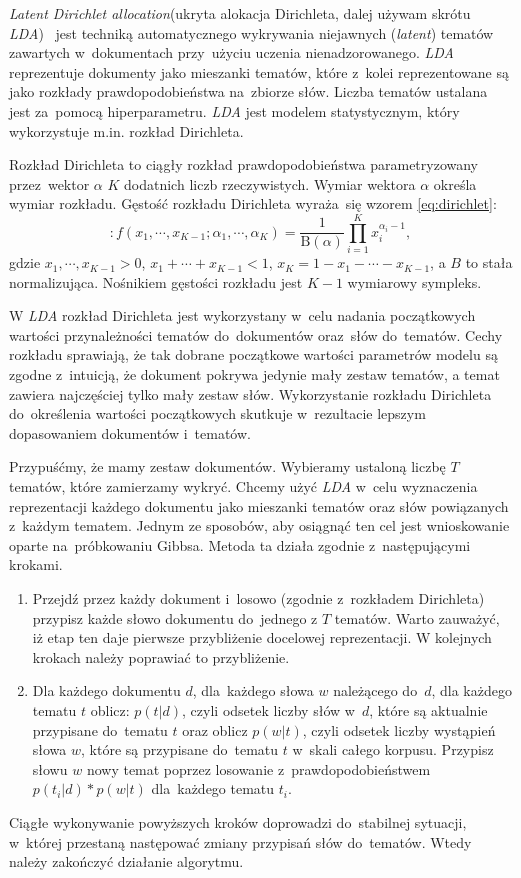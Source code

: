 \documentclass[pl]{minipw} %
\begin{document}
\textit{Latent Dirichlet allocation}(ukryta alokacja Dirichleta, dalej używam skrótu  \textit{LDA})~\cite{lda} jest techniką automatycznego wykrywania niejawnych (\textit{latent}) tematów zawartych w~dokumentach przy~użyciu uczenia nienadzorowanego. \textit{LDA} reprezentuje dokumenty jako mieszanki tematów, które z~kolei reprezentowane są jako rozkłady prawdopodobieństwa na~zbiorze słów. Liczba tematów ustalana jest za~pomocą hiperparametru. \textit{LDA} jest modelem statystycznym, który wykorzystuje m.in. rozkład Dirichleta. 

Rozkład Dirichleta to ciągły rozkład prawdopodobieństwa parametryzowany przez~wektor $\alpha$ $K$ dodatnich liczb rzeczywistych. Wymiar wektora $\alpha$ określa wymiar rozkładu. Gęstość rozkładu Dirichleta wyraża~się wzorem \ref{eq:dirichlet}: 
\begin{equation}
\label{eq:dirichlet}: 
f\left(x_{1},\cdots ,x_{K-1};\alpha _{1},\cdots ,\alpha _{K}\right)={\frac {1}{\mathrm {B} (\alpha )}}\prod _{i=1}^{K}x_{i}^{\alpha _{i}-1},
\end{equation}
gdzie $ x_{1},\cdots ,x_{K-1}>0$, $x_{1}+\cdots +x_{K-1}<1$, $x_{K}=1-x_{1}-\cdots -x_{K-1}$, a $B$ to stała normalizująca. Nośnikiem gęstości rozkładu jest $K-1$ wymiarowy sympleks.

W \textit{LDA} rozkład Dirichleta jest wykorzystany w~celu nadania początkowych wartości przynależności tematów do~dokumentów oraz~słów do~tematów. Cechy rozkładu sprawiają, że tak dobrane początkowe wartości parametrów modelu są zgodne z~intuicją, że dokument pokrywa jedynie mały zestaw tematów, a temat zawiera najczęściej tylko mały zestaw słów. Wykorzystanie rozkładu Dirichleta do~określenia wartości początkowych skutkuje w~rezultacie lepszym dopasowaniem dokumentów i~tematów.

Przypuśćmy, że mamy zestaw dokumentów. Wybieramy ustaloną liczbę $T$ tematów, które zamierzamy wykryć. Chcemy użyć \textit{LDA} w~celu wyznaczenia reprezentacji każdego dokumentu jako mieszanki tematów oraz słów powiązanych z~każdym tematem. Jednym ze sposobów, aby osiągnąć ten cel jest wnioskowanie oparte na~próbkowaniu Gibbsa. Metoda ta działa zgodnie z~następującymi krokami.

\begin{enumerate}
	\item Przejdź przez każdy dokument i~losowo (zgodnie z~rozkładem Dirichleta) przypisz każde słowo dokumentu do~jednego z $T$ tematów.
	Warto zauważyć, iż etap ten daje pierwsze przybliżenie docelowej reprezentacji. W kolejnych krokach należy poprawiać to przybliżenie.
	\item Dla każdego dokumentu $d$, dla~każdego słowa $w$ należącego do~$d$, dla każdego tematu $t$ oblicz: $p(t | d)$, czyli odsetek liczby słów w~$d$, które są aktualnie przypisane do~tematu $t$ oraz oblicz $p(w | t)$, czyli odsetek liczby wystąpień słowa $w$, które są przypisane do~tematu $t$ w~skali całego korpusu. Przypisz słowu $w$ nowy temat poprzez losowanie z~prawdopodobieństwem $p(t_i|d)*p(w|t)$ dla~każdego tematu $t_i$.
\end{enumerate}
Ciągłe wykonywanie powyższych kroków doprowadzi do~stabilnej sytuacji, w~której przestaną następować zmiany przypisań słów do~tematów. Wtedy należy zakończyć działanie algorytmu.
\end{document}

